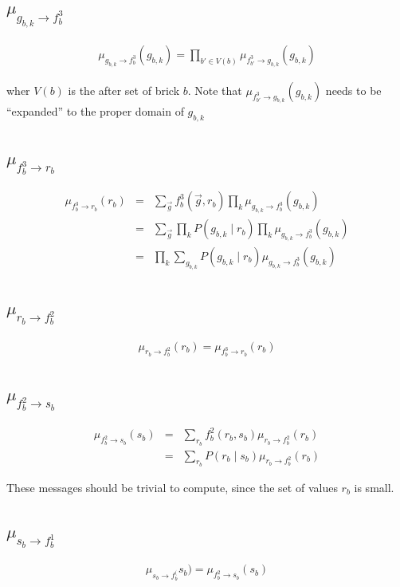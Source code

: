 \documentclass[11pt]{article}
\newcommand{\fb}[1]{f_b^{#1}}
\newcommand{\mSbFb}[1]{\mu_{s_{b} \rightarrow \fb{#1}}}
\newcommand{\mFbSb}[1]{\mu_{ \fb{#1} \rightarrow s_{b}}}
\newcommand{\mFbRb}[1]{\mu_{ \fb{#1} \rightarrow r_{b}}}
\newcommand{\mRbFb}[1]{\mu_{ r_{b} \rightarrow  \fb{#1}}}
\newcommand{\mGbkFb}[1]{\mu_{  g_{b,k} \rightarrow \fb{#1}}}
\begin{document}
\subsection{$\mGbkFb3$}

\begin{eqnarray}
\mGbkFb3(g_{b,k}) = \prod_{b' \in V(b)} \mu_{f_{b'}^3 \rightarrow g_{b,k}}(g_{b,k})
\end{eqnarray}

wher $V(b)$ is the after set of brick $b$. Note that $ \mu_{f_{b'}^3 \rightarrow g_{b,k}}(g_{b,k})$ needs to be ``expanded'' to the proper domain of $g_{b,k}$

\subsection{$\mFbRb3$}

\begin{eqnarray}
\mFbRb3(r_{b}) &=& \sum_{\vec{g}} \fb3(\vec{g},r_b) \prod_{k} \mGbkFb3(g_{b,k}) \\
&=& \sum_{\vec{g}}\prod_{k} P(g_{b,k} \mid r_b) \prod_{k} \mGbkFb3(g_{b,k}) \\
&=&\prod_{k} \sum_{g_{b,k}} P(g_{b,k} \mid r_b) \mGbkFb3(g_{b,k})
\end{eqnarray}

\subsection{$\mRbFb2$}

\begin{eqnarray}
\mRbFb2(r_b) = \mFbRb3(r_b)
\end{eqnarray}

\subsection{$\mFbSb2$}

\begin{eqnarray}
\mFbSb2(s_b) &=& \sum_{r_b} \fb2(r_b,s_b) \mRbFb2(r_b) \\
&=&  \sum_{r_b} P(r_b \mid s_b) \mRbFb2(r_b)
\end{eqnarray}

These messages should be trivial to compute, since the set of values $r_b$ is small.

\subsection{$\mSbFb1$}

\begin{eqnarray}
\mSbFb(s_b) = \mFbSb2(s_b)
\end{eqnarray}
\end{document}

